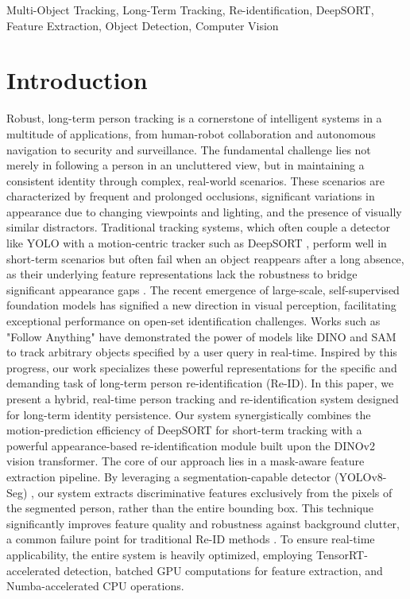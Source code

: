 \documentclass[conference]{IEEEtran}
\begin{document}
\begin{IEEEkeywords}
Multi-Object Tracking, Long-Term Tracking, Re-identification, DeepSORT, Feature Extraction, Object Detection, Computer Vision
\end{IEEEkeywords}

\section{Introduction}
Robust, long-term person tracking is a cornerstone of intelligent systems in a multitude of applications, from human-robot collaboration and autonomous navigation to security and surveillance. The fundamental challenge lies not merely in following a person in an uncluttered view, but in maintaining a consistent identity through complex, real-world scenarios. These scenarios are characterized by frequent and prolonged occlusions, significant variations in appearance due to changing viewpoints and lighting, and the presence of visually similar distractors. Traditional tracking systems, which often couple a detector like YOLO \cite{7780460} with a motion-centric tracker such as DeepSORT \cite{Wojke2017simple,Wojke2018deep}, perform well in short-term scenarios but often fail when an object reappears after a long absence, as their underlying feature representations lack the robustness to bridge significant appearance gaps \cite{10623162}. The recent emergence of large-scale, self-supervised foundation models has signified a new direction in visual perception, facilitating exceptional performance on open-set identification challenges. Works such as "Follow Anything" \cite{maalouf2023follow} have demonstrated the power of models like DINO \cite{DBLP:journals/corr/abs-2104-14294} and SAM \cite{10378323} to track arbitrary objects specified by a user query in real-time. Inspired by this progress, our work specializes these powerful representations for the specific and demanding task of long-term person re-identification (Re-ID). In this paper, we present a hybrid, real-time person tracking and re-identification system designed for long-term identity persistence. Our system synergistically combines the motion-prediction efficiency of DeepSORT for short-term tracking with a powerful appearance-based re-identification module built upon the DINOv2 \cite{oquab2023dinov2,darcet2023vitneedreg,jose2024dinov2meetstextunified} vision transformer. The core of our approach lies in a mask-aware feature extraction pipeline. By leveraging a segmentation-capable detector (YOLOv8-Seg) \cite{Jocher_Ultralytics_YOLO_2023,10533619}, our system extracts discriminative features exclusively from the pixels of the segmented person, rather than the entire bounding box. This technique significantly improves feature quality and robustness against background clutter, a common failure point for traditional Re-ID methods \cite{Seong_2023}. To ensure real-time applicability, the entire system is heavily optimized, employing TensorRT-accelerated \cite{nvidia_tensorrt} detection, batched GPU computations for feature extraction, and Numba-accelerated\cite{10.1145/2833157.2833162} CPU operations.\\
\end{document}
